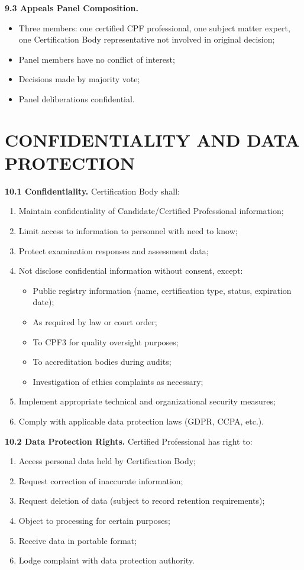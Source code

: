 \documentclass[11pt,a4paper]{article}
\begin{document}
\textbf{9.3 Appeals Panel Composition.}

\begin{itemize}
\item Three members: one certified CPF professional, one subject matter expert, one Certification Body representative not involved in original decision;
\item Panel members have no conflict of interest;
\item Decisions made by majority vote;
\item Panel deliberations confidential.
\end{itemize}

\section{CONFIDENTIALITY AND DATA PROTECTION}

\textbf{10.1 Confidentiality.} Certification Body shall:

\begin{enumerate}[label=\alph*)]
\item Maintain confidentiality of Candidate/Certified Professional information;
\item Limit access to information to personnel with need to know;
\item Protect examination responses and assessment data;
\item Not disclose confidential information without consent, except:
\begin{itemize}
\item Public registry information (name, certification type, status, expiration date);
\item As required by law or court order;
\item To CPF3 for quality oversight purposes;
\item To accreditation bodies during audits;
\item Investigation of ethics complaints as necessary;
\end{itemize}
\item Implement appropriate technical and organizational security measures;
\item Comply with applicable data protection laws (GDPR, CCPA, etc.).
\end{enumerate}

\textbf{10.2 Data Protection Rights.} Certified Professional has right to:

\begin{enumerate}[label=\alph*)]
\item Access personal data held by Certification Body;
\item Request correction of inaccurate information;
\item Request deletion of data (subject to record retention requirements);
\item Object to processing for certain purposes;
\item Receive data in portable format;
\item Lodge complaint with data protection authority.
\end{enumerate}
\end{document}
